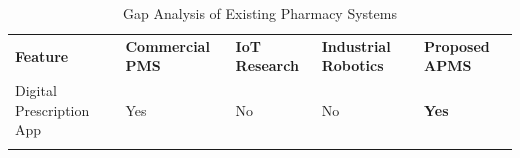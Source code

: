 \documentclass[12pt,a4paper,oneside]{report}
\begin{document}
\begin{longtable}[]{@{}
  >{\raggedright\arraybackslash}p{}
  >{\raggedright\arraybackslash}p{}
  >{\raggedright\arraybackslash}p{}
  >{\raggedright\arraybackslash}p{}
  >{\raggedright\arraybackslash}p{}@{}}
\caption{Gap Analysis of Existing Pharmacy Systems\label{tab:table3}}\\

\toprule\noalign{}
\begin{minipage}[b]{\linewidth}\raggedright

\textbf{Feature}

\end{minipage} & \begin{minipage}[b]{\linewidth}\centering
\textbf{Commercial PMS}
\end{minipage} & \begin{minipage}[b]{\linewidth}\centering
\textbf{IoT Research}
\end{minipage} & \begin{minipage}[b]{\linewidth}\centering
\textbf{Industrial Robotics}
\end{minipage} & \begin{minipage}[b]{\linewidth}\centering
\textbf{Proposed APMS}
\end{minipage} \\
\begin{minipage}[b]{\linewidth}\raggedright

Digital Prescription App

\end{minipage} & \begin{minipage}[b]{\linewidth}\centering

Yes

\end{minipage} & \begin{minipage}[b]{\linewidth}\centering
No
\end{minipage} & \begin{minipage}[b]{\linewidth}\centering
No
\end{minipage} & \begin{minipage}[b]{\linewidth}\centering
\textbf{Yes}
\end{minipage} \\
\begin{minipage}[b]{\linewidth}\raggedright


\end{minipage}
\end{longtable}
\end{document}
